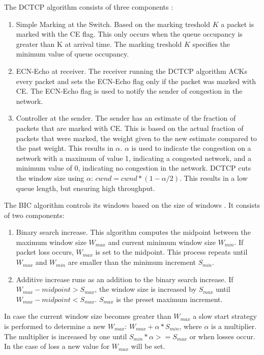\documentclass{article}
\begin{document}
The DCTCP algorithm consists of three components \cite{dctcp-congestion-original}:

\begin{enumerate}
	\item Simple Marking at the Switch. Based on the marking treshold $K$ a packet is marked with the CE flag. This only occurs when the queue occupancy is greater than K at arrival time. The marking treshold $K$ specifies the minimum value of queue occupancy.
	\item ECN-Echo at receiver. The receiver running the DCTCP algorithm ACKs every packet and sets the ECN-Echo flag only if the packet was marked with CE. The ECN-Echo flag is used to notify the sender of congestion in the network.
	\item Controller at the sender. The sender has an estimate of the fraction of packets that are marked with CE. This is based on the actual fraction of packets that were marked, the weight given to the new estimate compared to the past weight. This results in $\alpha$. $\alpha$ is used to indicate the congestion on a network with a maximum of value 1, indicating a congested network, and a minimum value of 0, indicating no congestion in the network. DCTCP cuts the window size using $\alpha$: $cwnd = cwnd * (1 - \alpha/2)$. This results in a low queue length, but ensuring high throughput.\\
\end{enumerate}

The BIC algorithm controls its windows based on the size of windows \cite{bic-tcp-congestion}. It consists of two components:

\begin{enumerate}
	\item Binary search increase. This algorithm computes the midpoint between the maximum window size $W_{max}$ and current minimum window size $W_{min}$. If packet loss occurs, $W_{max}$ is set to the midpoint. This process repeats until $W_{max}$ and $W_{min}$ are smaller than the minimum increment $S_{min}$.
	\item Additive increase runs as an addition to the binary search increase. If $W_{max} - midpoint > S_{max}$, the window size is increased by $S_{max}$ until $W_{max} - midpoint < S_{max}$. $S_{max}$ is the preset maximum increment.
\end{enumerate}
In case the current window size becomes greater than $W_{max}$ a slow start strategy is performed to determine a new $W_{max}$: $W_{max} + \alpha * S_{min}$, where $\alpha$ is a multiplier. The multiplier is increased by one until $S_{min} * \alpha >= S_{max}$ or when losses occur. In the case of loss a new value for $W_{max}$ will be set.
\end{document}
